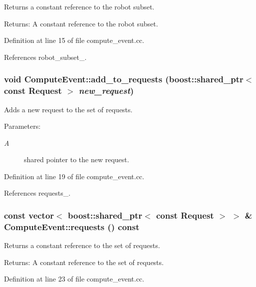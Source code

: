 Returns a constant reference to the robot subset. \begin{Desc}
\item[Returns:]A constant reference to the robot subset. \end{Desc}


Definition at line 15 of file compute\_\-event.cc.

References robot\_\-subset\_\-.\hypertarget{class_compute_event_97884cf9d3eebb04629883c239a7ecfa}{
\subsubsection[add\_\-to\_\-requests]{\setlength{\rightskip}{0pt plus 5cm}void ComputeEvent::add\_\-to\_\-requests (boost::shared\_\-ptr$<$ const {\bf Request} $>$ {\em new\_\-request})}}
\label{class_compute_event_97884cf9d3eebb04629883c239a7ecfa}


Adds a new request to the set of requests. \begin{Desc}
\item[Parameters:]
\begin{description}
\item[{\em A}]shared pointer to the new request. \end{description}
\end{Desc}


Definition at line 19 of file compute\_\-event.cc.

References requests\_\-.\hypertarget{class_compute_event_0e685c0e02288e058d59f7eeff83b74d}{
\subsubsection[requests]{\setlength{\rightskip}{0pt plus 5cm}const vector$<$ boost::shared\_\-ptr$<$ const {\bf Request} $>$ $>$ \& ComputeEvent::requests () const}}
\label{class_compute_event_0e685c0e02288e058d59f7eeff83b74d}


Returns a constant reference to the set of requests. \begin{Desc}
\item[Returns:]A constant reference to the set of requests. \end{Desc}


Definition at line 23 of file compute\_\-event.cc.

